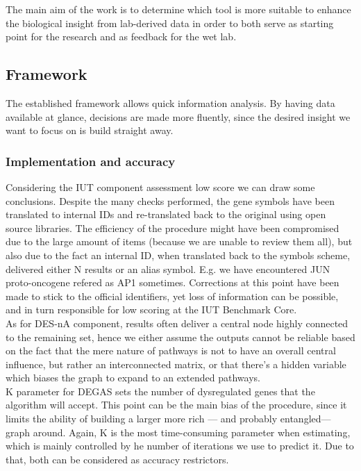 The main aim of the work is to determine which tool is more suitable to enhance the biological insight from lab-derived data in order to both serve as starting point for the research and as feedback for the wet lab.

\subsection{Framework}
The established framework allows quick information analysis. By having data available at glance, decisions are made more fluently, since the desired insight we want to focus on is build straight away.

\subsubsection{Implementation and accuracy}
Considering the IUT component assessment low score we can draw some conclusions. Despite the many checks performed, the gene symbols have been translated to internal IDs and re-translated back to the original using open source libraries. The efficiency of the procedure might have been compromised due to the large amount of items (because we are unable to review them all), but also due to the fact an internal ID, when translated back to the symbols scheme, delivered either N results or an alias symbol. E.g. we have encountered JUN proto-oncogene refered as AP1 sometimes. Corrections at this point have been made to stick to the official identifiers, yet loss of information can be possible, and in turn responsible for low scoring at the IUT Benchmark Core.
\\

As for DES-nA component, results often deliver a central node highly connected to the remaining set, hence we either assume the outputs cannot be reliable based on the fact that the mere nature of pathways is not to have an overall central influence, but rather an interconnected matrix, or that there’s a hidden variable which biases the graph to expand to an extended pathways.
\\

K  parameter for DEGAS sets the number of dysregulated genes that the algorithm will accept. This point can be the main bias of the procedure, since it limits the ability of building a larger more rich — and  probably entangled— graph around. Again, K is the most time-consuming parameter when estimating, which is mainly controlled by he number of iterations we use to predict it. Due to that, both can be considered as accuracy restrictors.
\\

